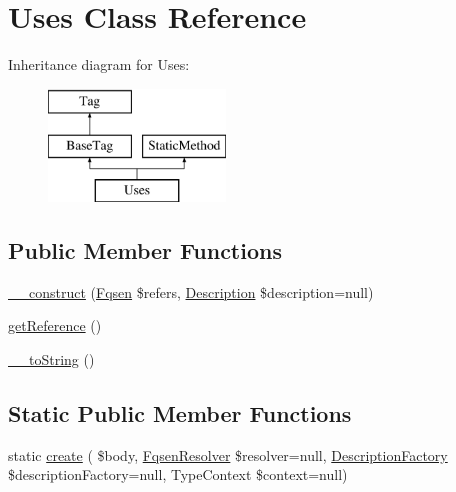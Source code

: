 \hypertarget{classphp_documentor_1_1_reflection_1_1_doc_block_1_1_tags_1_1_uses}{}\section{Uses Class Reference}
\label{classphp_documentor_1_1_reflection_1_1_doc_block_1_1_tags_1_1_uses}
Inheritance diagram for Uses\+:\begin{figure}[H]
\begin{center}
\leavevmode
\includegraphics[height=3.000000cm]{classphp_documentor_1_1_reflection_1_1_doc_block_1_1_tags_1_1_uses}
\end{center}
\end{figure}
\subsection*{Public Member Functions}
\begin{DoxyCompactItemize}
\item 
\mbox{\hyperlink{classphp_documentor_1_1_reflection_1_1_doc_block_1_1_tags_1_1_uses_a606211073a6fa4ef434859f156764469}{\+\_\+\+\_\+construct}} (\mbox{\hyperlink{classphp_documentor_1_1_reflection_1_1_fqsen}{Fqsen}} \$refers, \mbox{\hyperlink{classphp_documentor_1_1_reflection_1_1_doc_block_1_1_description}{Description}} \$description=null)
\item 
\mbox{\hyperlink{classphp_documentor_1_1_reflection_1_1_doc_block_1_1_tags_1_1_uses_a1f54573d48e07a7250b74f80b8493f1d}{get\+Reference}} ()
\item 
\mbox{\hyperlink{classphp_documentor_1_1_reflection_1_1_doc_block_1_1_tags_1_1_uses_a7516ca30af0db3cdbf9a7739b48ce91d}{\+\_\+\+\_\+to\+String}} ()
\end{DoxyCompactItemize}
\subsection*{Static Public Member Functions}
\begin{DoxyCompactItemize}
\item 
static \mbox{\hyperlink{classphp_documentor_1_1_reflection_1_1_doc_block_1_1_tags_1_1_uses_a7722e68bb1d72775a140867f125d2483}{create}} ( \$body, \mbox{\hyperlink{classphp_documentor_1_1_reflection_1_1_fqsen_resolver}{Fqsen\+Resolver}} \$resolver=null, \mbox{\hyperlink{classphp_documentor_1_1_reflection_1_1_doc_block_1_1_description_factory}{Description\+Factory}} \$description\+Factory=null, Type\+Context \$context=null)
\end{DoxyCompactItemize}

